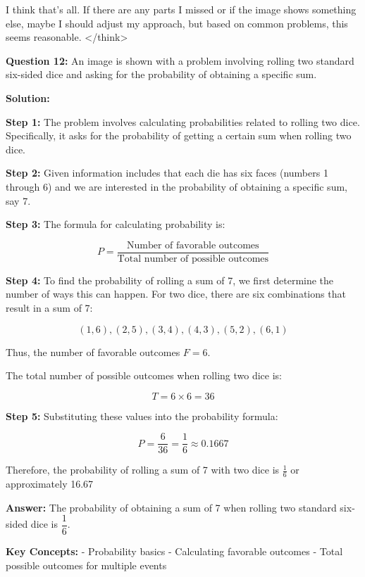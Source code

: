 I think that's all. If there are any parts I missed or if the image shows something else, maybe I should adjust my approach, but based on common problems, this seems reasonable.
</think>

\textbf{Question 12:}  
An image is shown with a problem involving rolling two standard six-sided dice and asking for the probability of obtaining a specific sum.

\textbf{Solution:}

\textbf{Step 1:}  
The problem involves calculating probabilities related to rolling two dice. Specifically, it asks for the probability of getting a certain sum when rolling two dice.

\textbf{Step 2:}  
Given information includes that each die has six faces (numbers 1 through 6) and we are interested in the probability of obtaining a specific sum, say 7.

\textbf{Step 3:}  
The formula for calculating probability is:

\[ P = \frac{\text{Number of favorable outcomes}}{\text{Total number of possible outcomes}} \]

\textbf{Step 4:}  
To find the probability of rolling a sum of 7, we first determine the number of ways this can happen. For two dice, there are six combinations that result in a sum of 7:

\[ (1,6), (2,5), (3,4), (4,3), (5,2), (6,1) \]

Thus, the number of favorable outcomes \( F = 6 \).

The total number of possible outcomes when rolling two dice is:

\[ T = 6 \times 6 = 36 \]

\textbf{Step 5:}  
Substituting these values into the probability formula:

\[ P = \frac{6}{36} = \frac{1}{6} \approx 0.1667 \]

Therefore, the probability of rolling a sum of 7 with two dice is \( \frac{1}{6} \) or approximately 16.67%

\textbf{Answer:}  
The probability of obtaining a sum of 7 when rolling two standard six-sided dice is \( \boxed{\dfrac{1}{6}} \).

\textbf{Key Concepts:}  
- Probability basics
- Calculating favorable outcomes
- Total possible outcomes for multiple events